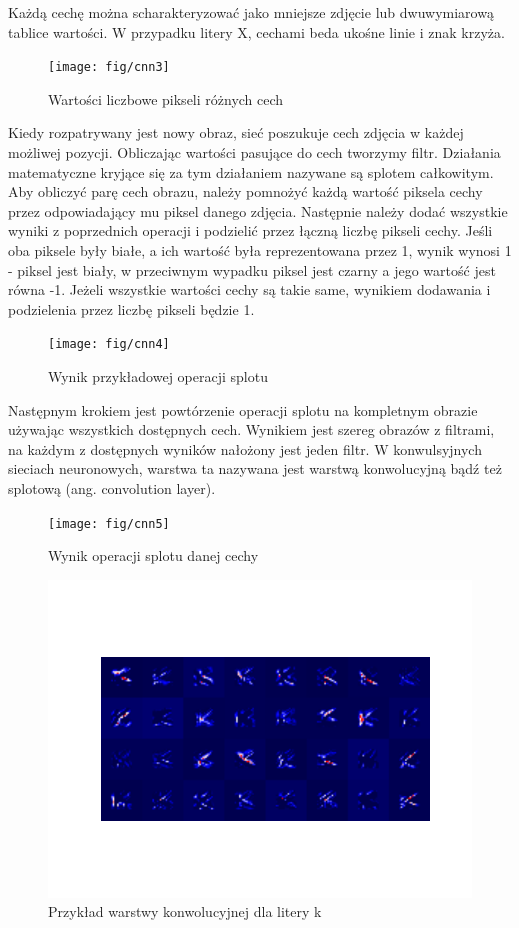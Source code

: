 \documentclass[brudnopis]{xmgr}
\begin{document}
Każdą cechę można scharakteryzować jako mniejsze zdjęcie lub dwuwymiarową tablice wartości. W przypadku litery X, cechami beda ukośne linie i znak krzyża.

\begin{figure}[!tbh]
\centering
\texttt{[image: fig/cnn3]}
\caption{Wartości liczbowe pikseli różnych cech}
\end{figure}
\newpage

Kiedy rozpatrywany jest nowy obraz, sieć poszukuje cech zdjęcia w każdej możliwej pozycji. Obliczając wartości pasujące do cech tworzymy filtr. Działania matematyczne kryjące się za tym działaniem nazywane są splotem całkowitym. Aby obliczyć parę cech obrazu, należy pomnożyć każdą wartość piksela cechy przez odpowiadający mu piksel danego zdjęcia. Następnie należy dodać wszystkie wyniki z poprzednich operacji i podzielić przez łączną liczbę pikseli cechy. Jeśli oba piksele były białe, a ich wartość była reprezentowana przez 1, wynik wynosi 1 - piksel jest biały, w przeciwnym wypadku piksel jest czarny a jego wartość jest równa -1. Jeżeli wszystkie wartości cechy są takie same, wynikiem dodawania i podzielenia przez liczbę pikseli będzie 1.

\begin{figure}[!tbh]
\centering
\texttt{[image: fig/cnn4]}
\caption{Wynik przykładowej operacji splotu}
\end{figure}
\newpage

Następnym krokiem jest powtórzenie operacji splotu na kompletnym obrazie używając wszystkich dostępnych cech. Wynikiem jest szereg obrazów z filtrami, na każdym z dostępnych wyników nałożony jest jeden filtr. W konwulsyjnych sieciach neuronowych, warstwa ta nazywana jest warstwą konwolucyjną bądź też splotową (ang. convolution layer).

\begin{figure}[!tbh]
\centering
\texttt{[image: fig/cnn5]}
\caption{Wynik operacji splotu danej cechy}
\end{figure}

\begin{figure}[!tbh]
\centering
\includegraphics[width=.8\hsize]{fig/figure_1}
\caption{Przykład warstwy konwolucyjnej dla litery k}
\end{figure}
\newpage
\end{document}
